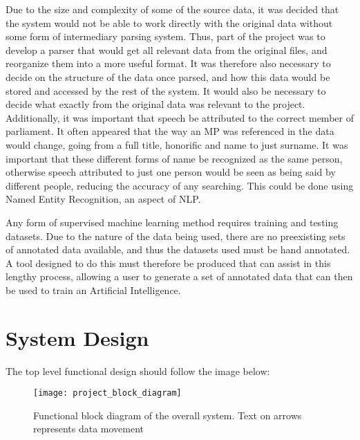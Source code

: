 Due to the size and complexity of some of the source data, it was decided that the system would not be able to work directly with the original data without some form of intermediary parsing system. Thus, part of the project was to develop a parser that would get all relevant data from the original files, and reorganize them into a more useful format. It was therefore also necessary to decide on the structure of the data once parsed, and how this data would be stored and accessed by the rest of the system. It would also be necessary to decide what exactly from the original data was relevant to the project.
Additionally, it was important that speech be attributed to the correct member of parliament. It often appeared that the way an MP was referenced in the data would change, going from a full title, honorific and name to just surname. It was important that these different forms of name be recognized as the same person, otherwise speech attributed to just one person would be seen as being said by different people, reducing the accuracy of any searching. This could be done using Named Entity Recognition, an aspect of NLP.

Any form of supervised machine learning method requires training and testing datasets. Due to the nature of the data being used, there are no preexisting sets of annotated data available, and thus the datasets used must be hand annotated. A tool designed to do this must therefore be produced that can assist in this lengthy process, allowing a user to generate a set of annotated data that can then be used to train an Artificial Intelligence.
\newpage
\section{System Design}
The top level functional design should follow the image below:

\begin{figure}[h]
	\texttt{[image: project\_block\_diagram]}
	\caption{Functional block diagram of the overall system. Text on arrows represents data movement}
\end{figure}


